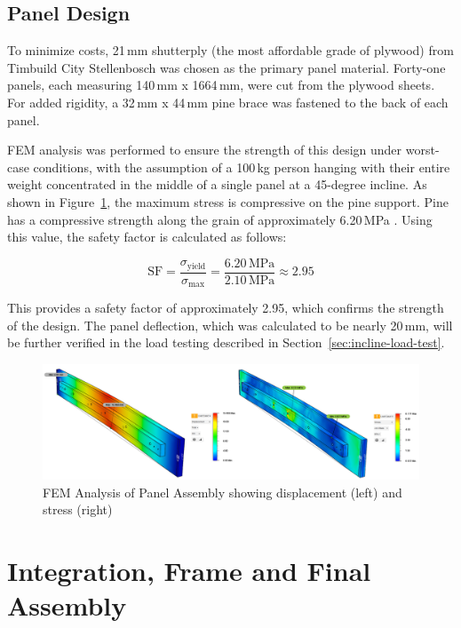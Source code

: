 \subsection{Panel Design}
To minimize costs, 21\,mm shutterply (the most affordable grade of plywood) from Timbuild City Stellenbosch was chosen as the primary panel material. Forty-one panels, each measuring 140\,mm x 1664\,mm, were cut from the plywood sheets. For added rigidity, a 32\,mm x 44\,mm pine brace was fastened to the back of each panel.

FEM analysis was performed to ensure the strength of this design under worst-case conditions, with the assumption of a 100\,kg person hanging with their entire weight concentrated in the middle of a single panel at a 45-degree incline. As shown in Figure~\ref{fig:FEM-panel}, the maximum stress is compressive on the pine support. Pine has a compressive strength along the grain of approximately 6.20\,MPa \cite{matweb2024pine}. Using this value, the safety factor is calculated as follows:

\[
\text{SF} = \frac{\sigma_{\text{yield}}}{\sigma_{\text{max}}} = \frac{6.20 \, \text{MPa}}{2.10 \, \text{MPa}} \approx 2.95
\]

This provides a safety factor of approximately 2.95, which confirms the strength of the design. The panel deflection, which was calculated to be nearly 20\,mm, will be further verified in the load testing described in Section~\ref{sec:incline-load-test}.

\begin{figure}[H]
    \centering
    \includegraphics[width=1\linewidth]{figs/FEM/FEM-panel.png}
    \caption{FEM Analysis of Panel Assembly showing displacement (left) and stress (right)}
    \label{fig:FEM-panel}
\end{figure}





\section{Integration, Frame and Final Assembly}

